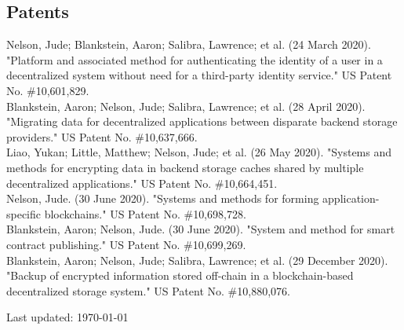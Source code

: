 \documentclass[11pt]{article} %
\begin{document}
\subsection*{Patents}

Nelson, Jude; Blankstein, Aaron; Salibra, Lawrence; et al. (24
March 2020).  "Platform and associated method for authenticating the identity of
a user in a decentralized system without need for a third-party identity
service."  US Patent No. \#10,601,829.\\
Blankstein, Aaron; Nelson, Jude; Salibra, Lawrence; et al. (28
April 2020).  "Migrating data for decentralized applications between disparate
backend storage providers."  US Patent No. \#10,637,666.\\
Liao, Yukan; Little, Matthew; Nelson, Jude; et al. (26 May 2020).
"Systems and methods for encrypting data in backend storage caches shared by
multiple decentralized applications."  US Patent No. \#10,664,451.\\
Nelson, Jude. (30 June 2020).  "Systems and methods for forming application-specific
blockchains."  US Patent No. \#10,698,728.\\
Blankstein, Aaron; Nelson, Jude. (30 June 2020).  "System and method for smart
contract publishing."  US Patent No. \#10,699,269.\\
Blankstein, Aaron; Nelson, Jude; Salibra, Lawrence; et al. (29
December 2020).  "Backup of encrypted information stored off-chain in a
blockchain-based decentralized storage system."  US Patent No. \#10,880,076.\\

\begin{center}
	\scriptsize
	Last updated: \today
\end{center}

\end{document}
